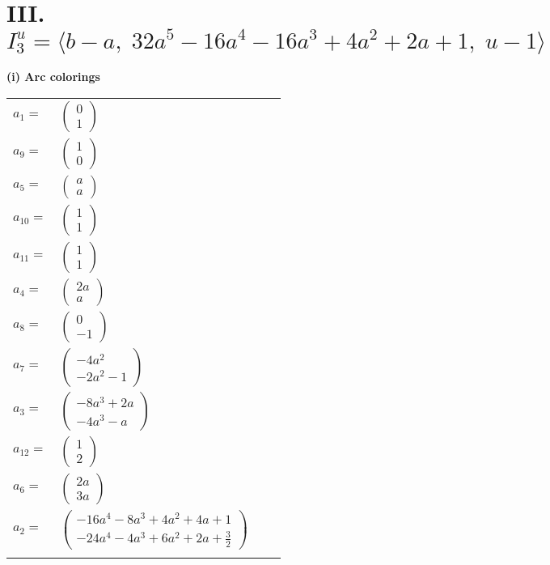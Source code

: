 \documentclass[1p]{elsarticle_modified}
\theoremstyle{definition}
\begin{document}
\centering \section*{III. $I^u_{3}= \langle b- a,\;32 a^5-16 a^4-16 a^3+4 a^2+2 a+1,\;u-1 \rangle$}
\flushleft \textbf{(i) Arc colorings}\\
\begin{tabular}{m{7pt} m{180pt} m{7pt} m{180pt} }
\flushright $a_{1}=$&$\begin{pmatrix}0\\1\end{pmatrix}$ \\
\flushright $a_{9}=$&$\begin{pmatrix}1\\0\end{pmatrix}$ \\
\flushright $a_{5}=$&$\begin{pmatrix}a\\a\end{pmatrix}$ \\
\flushright $a_{10}=$&$\begin{pmatrix}1\\1\end{pmatrix}$ \\
\flushright $a_{11}=$&$\begin{pmatrix}1\\1\end{pmatrix}$ \\
\flushright $a_{4}=$&$\begin{pmatrix}2 a\\a\end{pmatrix}$ \\
\flushright $a_{8}=$&$\begin{pmatrix}0\\-1\end{pmatrix}$ \\
\flushright $a_{7}=$&$\begin{pmatrix}-4 a^2\\-2 a^2-1\end{pmatrix}$ \\
\flushright $a_{3}=$&$\begin{pmatrix}-8 a^3+2 a\\-4 a^3- a\end{pmatrix}$ \\
\flushright $a_{12}=$&$\begin{pmatrix}1\\2\end{pmatrix}$ \\
\flushright $a_{6}=$&$\begin{pmatrix}2 a\\3 a\end{pmatrix}$ \\
\flushright $a_{2}=$&$\begin{pmatrix}-16 a^4-8 a^3+4 a^2+4 a+1\\-24 a^4-4 a^3+6 a^2+2 a+\frac{3}{2}\end{pmatrix}$\\&\end{tabular}
\end{document}
